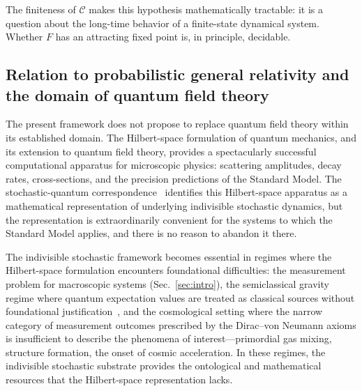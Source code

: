 \documentclass[aps,prd,twocolumn,superscriptaddress,nofootinbib]{revtex4-2}
\begin{document}
The finiteness of $\mathcal{C}$ makes this hypothesis mathematically tractable: it is a question about the long-time behavior of a finite-state dynamical system. Whether $F$ has an attracting fixed point is, in principle, decidable.

\subsection{Relation to probabilistic general relativity and the domain of quantum field theory}

The present framework does not propose to replace quantum field theory within its established domain. The Hilbert-space formulation of quantum mechanics, and its extension to quantum field theory, provides a spectacularly successful computational apparatus for microscopic physics: scattering amplitudes, decay rates, cross-sections, and the precision predictions of the Standard Model. The stochastic-quantum correspondence~\cite{Barandes2025SQC} identifies this Hilbert-space apparatus as a mathematical representation of underlying indivisible stochastic dynamics, but the representation is extraordinarily convenient for the systems to which the Standard Model applies, and there is no reason to abandon it there.

The indivisible stochastic framework becomes essential in regimes where the Hilbert-space formulation encounters foundational difficulties: the measurement problem for macroscopic systems (Sec.~\ref{sec:intro}), the semiclassical gravity regime where quantum expectation values are treated as classical sources without foundational justification~\cite{Jacobson1995}, and the cosmological setting where the narrow category of measurement outcomes prescribed by the Dirac--von Neumann axioms is insufficient to describe the phenomena of interest---primordial gas mixing, structure formation, the onset of cosmic acceleration. In these regimes, the indivisible stochastic substrate provides the ontological and mathematical resources that the Hilbert-space representation lacks.
\end{document}
